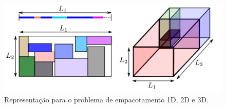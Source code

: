 \begin{figure}[!htb]
    \centering
    \includegraphics[scale=1]{utils/images/packing-example}
    \caption{Representação para o problema de empacotamento 1D, 2D e 3D.}
    \label{fig:packing-example}
\end{figure}

